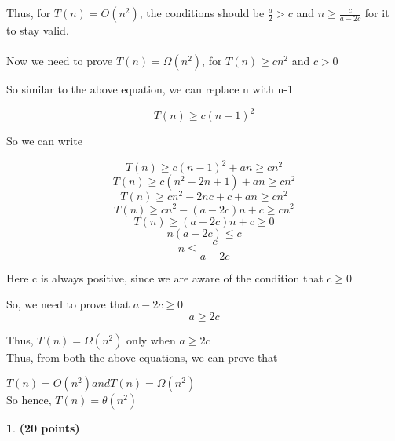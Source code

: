 \documentclass[11pt]{article}
\theoremstyle{definition}
\newtheorem{prob}{}
\newcommand{\solution}{\medskip\noindent{\color{DarkBlue}\textbf{Solution:}}}
\begin{document}
Thus, for $T(n) = O(n^2)$, the conditions should be $\frac{a}{2} > c$ and $ n \geq \frac{c}{a-2c}$ for it to stay valid. \\ \\

Now we need to prove $T(n) = \Omega(n^2)$, for $T(n) \geq cn^2$ and $c> 0$

So similar to the above equation, we can replace n with n-1

\[ T(n) \geq c(n-1)^2\]

So we can write

\[ T(n) \geq c(n-1)^2 + an \geq cn^2 \]
\[ T(n) \geq c(n^2-2n+1) + an \geq cn^2 \]
\[ T(n) \geq cn^2-2nc+c + an \geq cn^2 \]
\[ T(n) \geq cn^2-(a-2c)n + c \geq cn^2 \]
\[ T(n) \geq (a-2c)n + c \geq 0 \]
\[ n(a-2c) \leq c \]
\[ n \leq \frac{c}{a-2c} \]

Here c is always positive, since we are aware of the condition that $c \geq 0$

So, we need to prove that $a-2c \geq 0$
\[ a\geq 2c \]

Thus, $T(n) = \Omega(n^2)$ only when $a \geq 2c$ \\

Thus, from both the above equations, we can prove that

$T(n) = O(n^2) and T(n) = \Omega(n^2)$ \\

So hence, $T(n) = \theta(n^2)$

\begin{prob} \textbf{(20 points)}
\end{prob}
\solution \\
\end{document}

